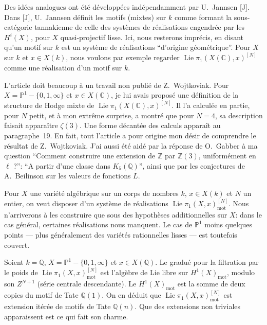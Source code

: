 \documentclass[12pt,a4paper]{article}
\theoremstyle{plain}
\theoremstyle{definition}
\theoremstyle{remark}
\DeclareMathOperator{\Lie}{Lie}
\newcommand{\mot}{\mathrm{mot}}
\providecommand{\mot}{\mathrm{mot}}
\providecommand{\Lie}{\operatorname{Lie}}
\begin{document}
Des id\'ees analogues ont \'et\'e d\'evelopp\'ees ind\'ependamment par U.~Jannsen [J].
Dans [J], U.~Jannsen d\'efinit les motifs (mixtes) sur $k$ comme formant la sous-cat\'egorie
tannakienne de celle des syst\`emes de r\'ealisations engendr\'ee par les $H^i(X)$, pour
$X$ quasi-projectif lisse. Ici, nous resterons impr\'ecis, en disant qu'un motif sur $k$
est un syst\`eme de r\'ealisations ``d'origine g\'eom\'etrique''. Pour $X$ sur $k$ et
$x \in X(k)$, nous voulons par exemple regarder $\Lie\pi_1(X(\mathbb{C}),x)^{[N]}$ comme
une r\'ealisation d'un motif sur $k$.

L'article doit beaucoup \`a un travail non publi\'e de Z.~Wojtkoviak. Pour
$X = \mathbb{P}^1 - \{0,1,\infty\}$ et $x \in X(\mathbb{C})$, je lui avais propos\'e une
d\'efinition de la structure de Hodge mixte de $\Lie\pi_1(X(\mathbb{C}),x)^{[N]}$. Il l'a
calcul\'ee en partie, pour $N$ petit, et \`a mon extr\^eme surprise, a montr\'e que pour $N=4$,
sa description faisait appara\^itre $\zeta(3)$. Une forme d\'ecant\'ee des calculs appara\^it
au paragraphe~19. En fait, tout l'article a pour origine mon d\'esir de comprendre le
r\'esultat de Z.~Wojtkoviak. J'ai aussi \'et\'e aid\'e par la r\'eponse de O.~Gabber \`a ma
question ``Comment construire une extension de $\mathbb{Z}$ par $\mathbb{Z}(3)$,
uniform\'ement en $\ell$ ?'': ``A partir d'une classe dans $K_5(\mathbb{Q})$'', ainsi que par
les conjectures de A.~Beilinson sur les valeurs de fonctions $L$.

Pour $X$ une vari\'et\'e alg\'ebrique sur un corps de nombres $k$, $x \in X(k)$ et $N$ un
entier, on veut disposer d'un syst\`eme de r\'ealisations
$\Lie\pi_1(X,x)^{[N]}_{\mot}$. Nous n'arriverons \`a les construire que sous des hypoth\`eses
additionnelles sur $X$: dans le cas g\'en\'eral, certaines r\'ealisations nous manquent.
Le cas de $\mathbb{P}^1$ moins quelques points --- plus g\'en\'eralement des vari\'et\'es rationnelles
lisses --- est toutefois couvert.

Soient $k = \mathbb{Q}$, $X = \mathbb{P}^1 - \{0,1,\infty\}$ et $x \in X(\mathbb{Q})$. Le gradu\'e
pour la filtration par le poids de $\Lie\pi_1(X,x)^{[N]}_{\mot}$ est l'alg\`ebre de Lie libre
sur $H^1(X)_{\mot}$, modulo son $Z^{N+1}$ (s\'erie centrale descendante). Le $H^1(X)_{\mot}$
est la somme de deux copies du motif de Tate $\mathbb{Q}(1)$. On en d\'eduit que
$\Lie\pi_1(X,x)^{[N]}_{\mot}$ est extension it\'er\'ee de motifs de Tate $\mathbb{Q}(n)$. Que des
extensions non triviales apparaissent est ce qui fait son charme.
\end{document}
